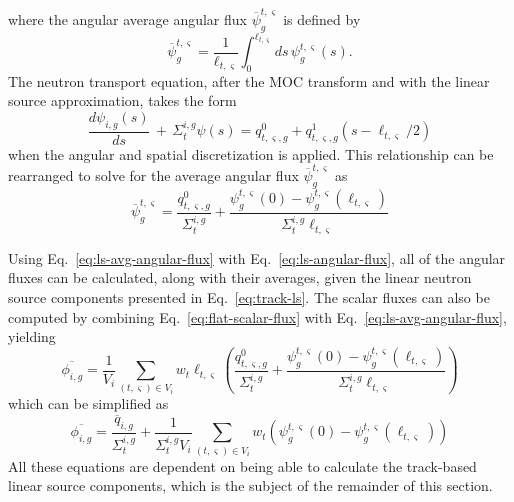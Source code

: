 where the angular average angular flux $\overline{\psi}^{t,\varsigma}_g$ is defined by
\begin{equation}
\overline{\psi}^{t,\varsigma}_g = \frac{1}{\ell_{t,\varsigma}}\int_{0}^{\ell_{t,\varsigma}} ds \, \psi^{t,\varsigma}_g(s).
\end{equation}
The neutron transport equation, after the MOC transform and with the linear source approximation, takes the form
\begin{equation}
	\frac{d\psi_{i,g}(s)}{ds} \, + \, \Sigma_{t}^{i,g} \psi(s) = q^0_{t,\varsigma,g} + q^1_{t,\varsigma,g}(s-\ell_{t,\varsigma}/2)
\end{equation}
when the angular and spatial discretization is applied. This relationship can be rearranged to solve for the average angular flux $\overline{\psi}^{t,\varsigma}_g$ as
\begin{equation}
\overline{\psi}^{t,\varsigma}_g = \frac{q^0_{t,\varsigma,g}}{\Sigma_{t}^{i,g}} + \frac{\psi^{t,\varsigma}_g(0) - \psi^{t,\varsigma}_g(\ell_{t,\varsigma})}{\Sigma_{t}^{i,g} \ell_{t,\varsigma}}
\label{eq:ls-avg-angular-flux}
\end{equation}

Using Eq.~\ref{eq:ls-avg-angular-flux} with Eq.~\ref{eq:ls-angular-flux}, all of the angular fluxes can be calculated, along with their averages, given the linear neutron source components presented in Eq.~\ref{eq:track-ls}. The scalar fluxes can also be computed by combining Eq.~\ref{eq:flat-scalar-flux} with Eq.~\ref{eq:ls-avg-angular-flux}, yielding
\begin{equation}
\overline{\phi_{i,g}} = \frac{1}{V_i} \sum_{(t,\varsigma) \in V_i} w_t \ell_{t,\varsigma} \left( \frac{q^0_{t,\varsigma,g}}{\Sigma_{t}^{i,g}} + \frac{\psi^{t,\varsigma}_g(0) - \psi^{t,\varsigma}_g(\ell_{t,\varsigma})}{\Sigma_{t}^{i,g} \ell_{t,\varsigma}} \right)
\end{equation}
which can be simplified as
\begin{equation}
\overline{\phi_{i,g}} = \frac{\overline{q}_{i,g}}{\Sigma_{t}^{i,g}} + \frac{1}{\Sigma_{t}^{i,g} V_i} \sum_{(t,\varsigma) \in V_i} w_t \left(\psi^{t,\varsigma}_g(0) - \psi^{t,\varsigma}_g(\ell_{t,\varsigma}) \right)
\label{eq:ls-avg-scalar-flux}
\end{equation}
All these equations are dependent on being able to calculate the track-based linear source components, which is the subject of the remainder of this section.

